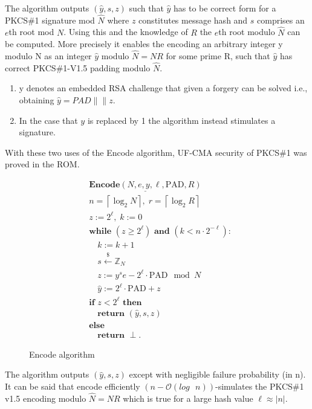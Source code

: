\documentclass[]{final_report}
\theoremstyle{definition}
\begin{document}
The algorithm outputs \((\widehat{y}, s, z)\) such that \(\widehat{y}\) has to be correct form for a PKCS\#1 signature mod \(\widehat{N}\) where \(z\) constitutes message hash and \(s\) comprises an \(e\)th root mod \(N\). Using this and the knowledge of \(R\) the \(e\)th root modulo \(\widehat{N}\) can be computed. More precisely it enables the encoding an arbitrary integer y modulo N as an integer $\hat{y}$ modulo $\hat{N} = NR$ for some prime R, such that $\widehat{y}$ has correct PKCS\#1-V1.5 padding modulo $\hat{N}$.

\begin{enumerate}
\item y denotes an embedded RSA challenge that given a forgery can be solved i.e., obtaining \(\widehat{y} = PAD\|\|z \). 
\item In the case that \(y\) is replaced by 1 the algorithm instead stimulates a signature. 
\end{enumerate}
With these two uses of the Encode algorithm, UF-CMA security of PKCS\#1 was proved in the ROM. 

\begin{figure}[H]
\centering
\[
\boxed{
\begin{aligned}
&\underline{\textbf{Encode} (N, e, y, \ell, \text{PAD}, R)} \\
&n = \left\lceil \log_2 N \right\rceil, \; r = \left\lceil \log_2 R \right\rceil \\
&z := 2^\ell, \; k := 0 \\
&\textbf{while } (z \geq 2^\ell) \textbf{ and } (k < n \cdot 2^{-\ell}): \\
&\quad k := k + 1 \\
&\quad s \xleftarrow{\$} \mathbb{Z}_N \\
&\quad z := y^s e - 2^\ell \cdot \text{PAD} \mod N \\
&\quad \widehat{y} := 2^\ell \cdot \text{PAD} + z \\
&\textbf{if } z < 2^\ell \textbf{ then} \\
&\quad \textbf{return } (\widehat{y}, s, z) \\
&\textbf{else} \\
&\quad \textbf{return } \perp.
\end{aligned}
}
\]
\caption{Encode algorithm \cite{jager2018security}}
\label{fig:encode}
\end{figure}

The algorithm outputs \((\widehat{y}, s, z)\) except with negligible failure probability (in n). It can be said that encode efficiently $(n - \mathcal{O}(log \text{ } n))$-simulates the PKCS\#1 v1.5 encoding modulo $\hat{N} = NR$ which is true for a large hash value $\ell \approx |n|$.
\end{document}
